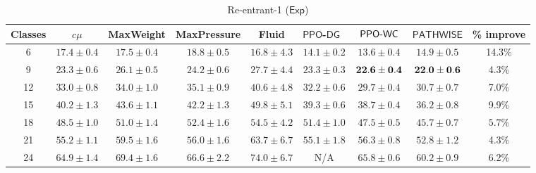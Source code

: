 \vspace{1em}
\begin{table}[h!]
\centering
 \caption{Re-entrant-1 ($\mathsf{Exp}$)}%
\begin{tabular}{ccccccccc}
\toprule 
{\footnotesize{}Classes} & {\footnotesize{}$c\mu$ } & {\footnotesize{}MaxWeight } & {\footnotesize{}MaxPressure} & {\footnotesize{}Fluid } & {\footnotesize{}$\mathsf{PPO}$-$\mathsf{DG}$~\cite{dai2022queueing} } & {\footnotesize{}$\mathsf{PPO}\text{-}\mathsf{WC}$} & {\footnotesize{}$\mathsf{PATHWISE}$} & {\footnotesize{}\% improve}\tabularnewline
\midrule 
{\footnotesize{}6} & {\footnotesize{}$17.4\pm0.4$ } & {\footnotesize{}$17.5\pm0.4$ } & {\footnotesize{}$18.8\pm0.5$ } & {\footnotesize{}$16.8\pm4.3$} & {\footnotesize{}$14.1\pm0.2$ } & {\footnotesize{}$\mathbf{13.6\pm0.4}$ } & {\footnotesize{}$14.9\pm0.5$ } & {\footnotesize{}14.3\%}\tabularnewline
\midrule 
{\footnotesize{}9} & {\footnotesize{}$23.3\pm0.6$ } & {\footnotesize{}$26.1\pm0.5$ } & {\footnotesize{}$24.2\pm0.6$ } & {\footnotesize{}$27.7\pm4.4$} & {\footnotesize{}$23.3\pm0.3$ } & {\footnotesize{}${\bf 22.6\pm0.4}$ } & {\footnotesize{}${\bf 22.0\pm0.6}$ } & {\footnotesize{}4.3\%}\tabularnewline
\midrule 
{\footnotesize{}12 } & {\footnotesize{}$33.0\pm0.8$ } & {\footnotesize{}$34.0\pm1.0$ } & {\footnotesize{}$35.1\pm0.9$ } & {\footnotesize{}$40.6\pm4.8$} & {\footnotesize{}$32.2\pm0.6$ } & {\footnotesize{}$\mathbf{29.7\pm0.4}$ } & {\footnotesize{}$\mathbf{30.7\pm0.7}$ } & {\footnotesize{}7.0\%}\tabularnewline
\midrule 
{\footnotesize{}15 } & {\footnotesize{}$40.2\pm1.3$ } & {\footnotesize{}$43.6\pm1.1$ } & {\footnotesize{}$42.2\pm1.3$ } & {\footnotesize{}$49.8\pm5.1$} & {\footnotesize{}$39.3\pm0.6$ } & {\footnotesize{}$38.7\pm0.4$ } & {\footnotesize{}$\mathbf{36.2\pm0.8}$ } & {\footnotesize{}9.9\%}\tabularnewline
\midrule 
{\footnotesize{}18 } & {\footnotesize{}$ 48.5\pm1.0$ } & {\footnotesize{}$51.0\pm1.4$ } & {\footnotesize{}$52.4\pm1.6$ } & {\footnotesize{}$54.5\pm4.2$} & {\footnotesize{}$51.4\pm1.0$ } & {\footnotesize{}$47.5\pm0.5$ } & {\footnotesize{}$\mathbf{45.7\pm0.7}$ } & {\footnotesize{}$5.7\%$}\tabularnewline
\midrule 
{\footnotesize{}21 } & {\footnotesize{}$55.2\pm1.1$ } & {\footnotesize{}$59.5\pm1.6$ } & {\footnotesize{}$56.0\pm1.6$} & {\footnotesize{}$63.7\pm6.7$} & {\footnotesize{}$55.1\pm1.8$} & {\footnotesize{}$56.3\pm0.8$ } & {\footnotesize{}$\mathbf{52.8\pm1.2}$ } & {\footnotesize{}4.3\%}\tabularnewline
\midrule 
{\footnotesize{}24 } & {\footnotesize{}$64.9\pm1.4$ } & {\footnotesize{}$69.4\pm1.6$ } & {\footnotesize{}$66.6\pm2.2$ } & {\footnotesize{}$74.0\pm6.7$} & {\footnotesize{}N/A} & {\footnotesize{}$65.8\pm0.6$ } & {\footnotesize{}$\mathbf{60.2\pm0.9}$ } & {\footnotesize{}6.2\%}\tabularnewline

\end{tabular}
\end{table}
